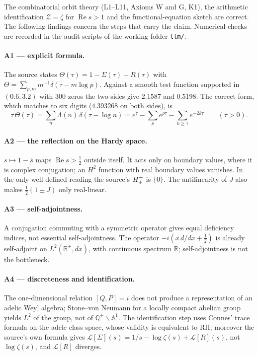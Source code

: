 The combinatorial orbit theory (L1--L11, Axioms W and G, K1), the arithmetic identification
\(\mathcal Z=\zeta\) for \(\operatorname{Re}s>1\) and the functional-equation sketch are correct.
The following findings concern the steps that carry the claim.  Numerical checks are recorded
in the audit scripts of the working folder \texttt{llm/}.

\paragraph{A1 --- explicit formula.}
The source states \(\Theta(\tau)=1-\Sigma(\tau)+R(\tau)\) with
\(\Theta=\sum_{p,m}m^{-1}\delta(\tau-m\log p)\).  Against a smooth test function supported in
\((0.6,3.2)\) with 300 zeros the two sides give \(2.1587\) and \(0.5198\).  The correct form,
which matches to six digits (\(4.393268\) on both sides), is
\[
\tau\,\Theta(\tau)=\sum_{n}\Lambda(n)\,\delta(\tau-\log n)
=e^{\tau}-\sum_{\rho}e^{\rho\tau}-\sum_{k\ge1}e^{-2k\tau}\qquad(\tau>0).
\]

\paragraph{A2 --- the reflection on the Hardy space.}
\(s\mapsto1-\bar s\) maps \(\operatorname{Re}s>\tfrac12\) outside itself.  It acts only on
boundary values, where it is complex conjugation; an \(H^2\) function with real boundary
values vanishes.  In the only well-defined reading the source's \(H^+_+\) is \(\{0\}\).
The antilinearity of \(J\) also makes \(\tfrac12(1\pm J)\) only real-linear.

\paragraph{A3 --- self-adjointness.}
A conjugation commuting with a symmetric operator gives equal deficiency indices, not
essential self-adjointness.  The operator \(-i(x\,d/dx+\tfrac12)\) is already self-adjoint on
\(L^2(\mathbb R^+,dx)\), with continuous spectrum \(\mathbb R\); self-adjointness is not the
bottleneck.

\paragraph{A4 --- discreteness and identification.}
The one-dimensional relation \([Q,P]=i\) does not produce a representation of an adelic Weyl
algebra; Stone--von Neumann for a locally compact abelian group yields \(L^2\) of the group,
not of \(\mathbb Q^+\backslash\mathbb A^1\).  The identification step uses Connes' trace formula
on the adele class space, whose validity is equivalent to RH; moreover the source's own formula
gives \(\mathcal L[\Sigma](s)=1/s-\log\zeta(s)+\mathcal L[R](s)\), not \(\log\zeta(s)\), and
\(\mathcal L[R]\) diverges.

